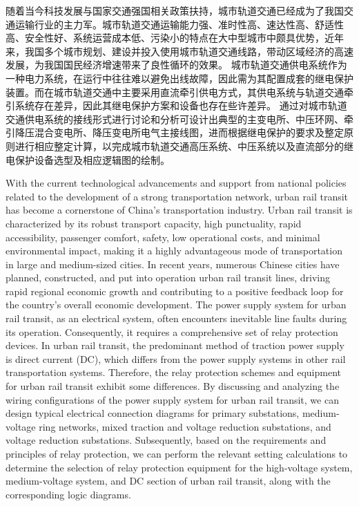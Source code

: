 \begin{cnabstract}
随着当今科技发展与国家交通强国相关政策扶持，城市轨道交通已经成为了我国交通运输行业的主力军。城市轨道交通运输能力强、准时性高、速达性高、舒适性高、安全性好、系统运营成本低、污染小的特点在大中型城市中颇具优势，近年来，我国多个城市规划、建设并投入使用城市轨道交通线路，带动区域经济的高速发展，为我国国民经济增速带来了良性循环的效果。
城市轨道交通供电系统作为一种电力系统，在运行中往往难以避免出线故障，因此需为其配置成套的继电保护装置。而在城市轨道交通中主要采用直流牵引供电方式，其供电系统与轨道交通牵引系统存在差异，因此其继电保护方案和设备也存在些许差异。
通过对城市轨道交通供电系统的接线形式进行讨论和分析可设计出典型的主变电所、中压环网、牵引降压混合变电所、降压变电所电气主接线图，进而根据继电保护的要求及整定原则进行相应整定计算，以完成城市轨道交通高压系统、中压系统以及直流部分的继电保护设备选型及相应逻辑图的绘制。
\end{cnabstract}
\vspace{1em}\par 
{}
\addtocounter{page}{-1}
\begin{enabstract}
With the current technological advancements and support from national policies related to the development of a strong transportation network, urban rail transit has become a cornerstone of China's transportation industry. Urban rail transit is characterized by its robust transport capacity, high punctuality, rapid accessibility, passenger comfort, safety, low operational costs, and minimal environmental impact, making it a highly advantageous mode of transportation in large and medium-sized cities. In recent years, numerous Chinese cities have planned, constructed, and put into operation urban rail transit lines, driving rapid regional economic growth and contributing to a positive feedback loop for the country's overall economic development.\cite[]{}
The power supply system for urban rail transit, as an electrical system, often encounters inevitable line faults during its operation. Consequently, it requires a comprehensive set of relay protection devices. In urban rail transit, the predominant method of traction power supply is direct current (DC), which differs from the power supply systems in other rail transportation systems. Therefore, the relay protection schemes and equipment for urban rail transit exhibit some differences.
By discussing and analyzing the wiring configurations of the power supply system for urban rail transit, we can design typical electrical connection diagrams for primary substations, medium-voltage ring networks, mixed traction and voltage reduction substations, and voltage reduction substations. Subsequently, based on the requirements and principles of relay protection, we can perform the relevant setting calculations to determine the selection of relay protection equipment for the high-voltage system, medium-voltage system, and DC section of urban rail transit, along with the corresponding logic diagrams.
\end{enabstract}
\vspace{1em}\par
{}